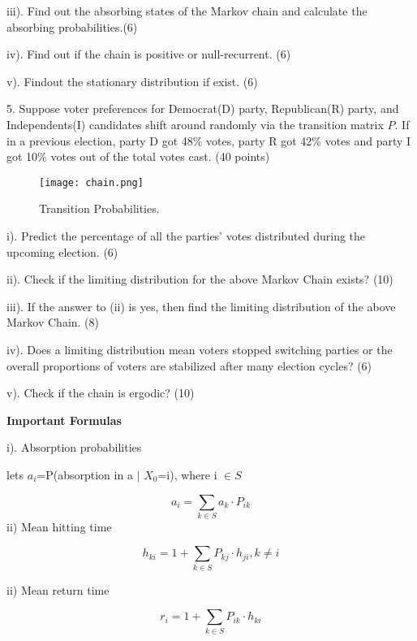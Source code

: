 \documentclass[6pt]{article}
\begin{document}
iii). Find out the absorbing states of the Markov chain and calculate the absorbing probabilities.(6)

\vspace{1500pt}

iv). Find out if the chain is positive or null-recurrent. (6)

\vspace{1500pt}

v). Findout the stationary distribution if exist. (6)

\vspace{1000pt}

5. Suppose voter preferences for Democrat(D) party, Republican(R) party, and Independents(I) candidates shift around randomly via the transition matrix $P$. If in a previous election, party D got 48\% votes, party R got 42\% votes and party I got 10\% votes out of the total votes cast. (40 points)

\begin{figure}
\centering
\texttt{[image: chain.png]}
\caption{Transition Probabilities.}
\label{fig:chain}
\end{figure}


i). Predict the percentage of all the parties' votes distributed during the upcoming election. (6)

\vspace{1000pt}

ii). Check if the limiting distribution for the above Markov Chain exists? (10)

\vspace{1000pt}

iii). If the answer to (ii) is yes, then find the limiting distribution of the above Markov Chain. (8)

\vspace{1000pt}

iv). Does a limiting distribution mean voters stopped switching parties or the overall proportions of voters are stabilized after many election cycles? (6)

\vspace{1000pt}

v). Check if the chain is ergodic? (10)


\vspace{1000pt}


\textbf{Important Formulas}

i). Absorption probabilities

lets $a_i$=P(absorption in a $\mid$ $X_0$=i), where i $\in S$

\[
a_{i} = \sum_{k \in S} a_{k} \cdot P_{ik}
\]
ii) Mean hitting time

\[
h_{ki} = 1+\sum_{k \in S} P_{kj} \cdot h_{ji}, k \ne i
\]

ii) Mean return time 

\[
r_{i} = 1+\sum_{k \in S} P_{ik} \cdot h_{ki}
\]
\end{document}
